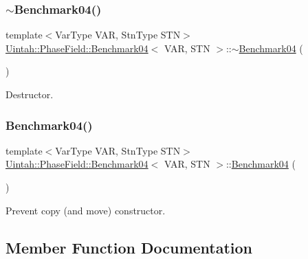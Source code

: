 \subsubsection{\texorpdfstring{$\sim$\+Benchmark04()}{~Benchmark04()}}
{\footnotesize\ttfamily template$<$Var\+Type V\+AR, Stn\+Type S\+TN$>$ \\
\hyperlink{classUintah_1_1PhaseField_1_1Benchmark04}{Uintah\+::\+Phase\+Field\+::\+Benchmark04}$<$ V\+AR, S\+TN $>$\+::$\sim$\hyperlink{classUintah_1_1PhaseField_1_1Benchmark04}{Benchmark04} (\begin{DoxyParamCaption}{ }\end{DoxyParamCaption})\hspace{0.3cm}{\ttfamily [virtual]}}



Destructor. 

\mbox{\label{classUintah_1_1PhaseField_1_1Benchmark04_ae552c55e6fe5ccbc34e175902a9dc03e}} 
\subsubsection{\texorpdfstring{Benchmark04()}{Benchmark04()}\hspace{0.1cm}{\footnotesize\ttfamily [2/2]}}
{\footnotesize\ttfamily template$<$Var\+Type V\+AR, Stn\+Type S\+TN$>$ \\
\hyperlink{classUintah_1_1PhaseField_1_1Benchmark04}{Uintah\+::\+Phase\+Field\+::\+Benchmark04}$<$ V\+AR, S\+TN $>$\+::\hyperlink{classUintah_1_1PhaseField_1_1Benchmark04}{Benchmark04} (\begin{DoxyParamCaption}\item[{\hyperlink{classUintah_1_1PhaseField_1_1Benchmark04}{Benchmark04}$<$ V\+AR, S\+TN $>$ const \&}]{ }\end{DoxyParamCaption})\hspace{0.3cm}{\ttfamily [delete]}}



Prevent copy (and move) constructor. 



\subsection{Member Function Documentation}
\mbox{\label{classUintah_1_1PhaseField_1_1Benchmark04_a9fe98191e28f7f10fcdda34319265ec9}} 

